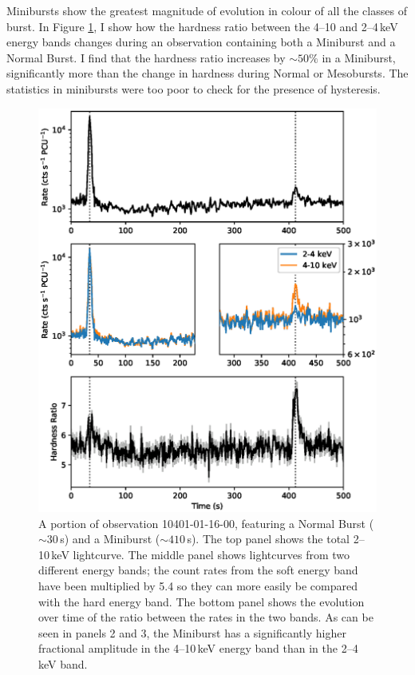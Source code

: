 \par Minibursts show the greatest magnitude of evolution in colour of all the classes of burst.  In Figure \ref{fig:minihard}, I show how the hardness ratio between the 4--10 and 2--4\,keV energy bands changes during an observation containing both a Miniburst and a Normal Burst.  I find that the hardness ratio increases by $\sim50\%$ in a Miniburst, significantly more than the change in hardness during Normal or Mesobursts.  The statistics in minibursts were too poor to check for the presence of hysteresis.

\begin{figure}
  \centering
  \includegraphics[width=.9\linewidth, trim={0.7cm 1.4cm 0.2cm 1.4cm},clip]{images/hardness_mini.eps}
  \caption[A portion of observation 10401-01-16-00, featuring a fNormal Burst and a Miniburst.]{\small A portion of observation 10401-01-16-00, featuring a Normal Burst ($\sim30$\,s) and a Miniburst ($\sim410$\,s).  The top panel shows the total 2--10\,keV lightcurve.  The middle panel shows lightcurves from two different energy bands; the count rates from the soft energy band have been multiplied by 5.4 so they can more easily be compared with the hard energy band.  The bottom panel shows the evolution over time of the ratio between the rates in the two bands.   As can be seen in panels 2 and 3, the Miniburst has a significantly higher fractional amplitude in the 4--10\,keV energy band than in the 2--4\,keV band.}
  \label{fig:minihard}
\end{figure}

